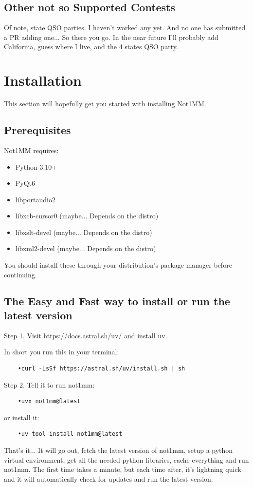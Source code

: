 \documentclass{article}
\begin{document}
\subsection{Other not so Supported Contests}
Of note, state QSO parties. I haven't worked any yet. And no one has submitted a PR adding one... So there you go. In the near future I'll probably add California, guess where I live, and the 4 states QSO party.
\newpage
\section{Installation}
This section will hopefully get you started with installing Not1MM.
\subsection{Prerequisites}
Not1MM requires:
\begin{itemize}
    \item Python 3.10+
    \item PyQt6
    \item libportaudio2
    \item libxcb-cursor0 (maybe... Depends on the distro)
    \item libxslt-devel  (maybe... Depends on the distro)
    \item libxml2-devel  (maybe... Depends on the distro)
\end{itemize}
You should install these through your distribution's package manager before continuing.
\subsection{The Easy and Fast way to install or run the latest version}

Step 1. Visit https://docs.astral.sh/uv/ and install uv.

In short you run this in your terminal:
\begin{verbatim}
    •curl -LsSf https://astral.sh/uv/install.sh | sh
\end{verbatim}
Step 2. Tell it to run not1mm:
\begin{verbatim}
    •uvx not1mm@latest
\end{verbatim}
or install it:
\begin{verbatim}
    •uv tool install not1mm@latest
\end{verbatim}

That's it... It will go out, fetch the latest version of not1mm, setup a python virtual environment, get all the needed python libraries, cache everything and run not1mm. The first time takes a minute, but each time after, it's lightning quick and it will automatically check for updates and run the latest version.
\end{document}
